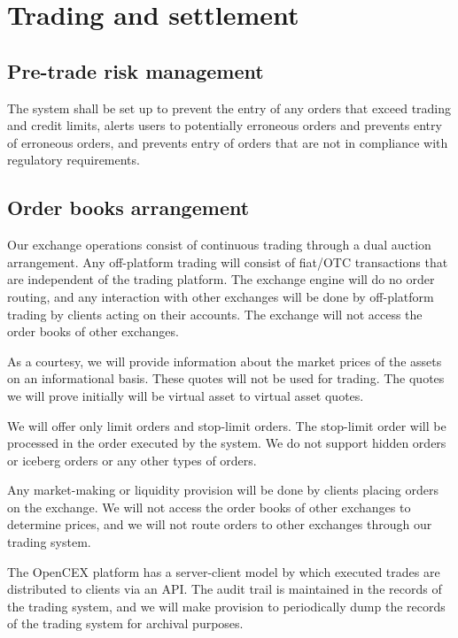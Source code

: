 \section{Trading and settlement}
\subsection{Pre-trade risk management}
The system shall be set up to prevent the entry of any orders that exceed
trading and credit limits, alerts users to potentially erroneous orders
and prevents entry of erroneous orders, and prevents entry of orders
that are not in compliance with regulatory requirements.

\subsection{Order books arrangement}

Our exchange operations consist of continuous trading through a dual
auction arrangement.  Any off-platform trading will consist of
fiat/OTC transactions that are independent of the trading platform.
The exchange engine will do no order routing, and any interaction with
other exchanges will be done by off-platform trading by clients acting
on their accounts.  The exchange will not access the order books of other
exchanges.

As a courtesy, we will provide information about the market prices of
the assets on an informational basis.  These quotes will not be used
for trading.  The quotes we will prove initially will be virtual asset
to virtual asset quotes.

We will offer only limit orders and stop-limit orders.  The stop-limit
order will be processed in the order executed by the system.  We do
not support hidden orders or iceberg orders or any other types of orders.

Any market-making or liquidity provision will be done by clients
placing orders on the exchange.  We will not access the order books of
other exchanges to determine prices, and we will not route orders to
other exchanges through our trading system.

The OpenCEX platform has a server-client model by which executed
trades are distributed to clients via an API.  The audit trail is
maintained in the records of the trading system, and we will make
provision to periodically dump the records of the trading system for
archival purposes.

